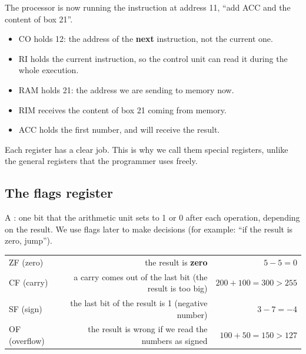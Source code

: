 \begin{mithal}
    The processor is now running the instruction at address 11, ``add ACC and the content of box 21''.
    \begin{itemize}
        \item CO holds 12: the address of the \textbf{next} instruction, not the current one.
        \item RI holds the current instruction, so the control unit can read it during the whole execution.
        \item RAM holds 21: the address we are sending to memory now.
        \item RIM receives the content of box 21 coming from memory.
        \item ACC holds the first number, and will receive the result.
    \end{itemize}
    Each register has a clear job. This is why we call them special registers, unlike the general registers
    that the programmer uses freely.
\end{mithal}

\subsection{The flags register}
\begin{tarif}
    A : one bit that the arithmetic unit sets to 1 or 0 after each
    operation, depending on the result. We use flags later to make decisions (for example: ``if the result is zero, jump'').
\end{tarif}

\begin{center}
\begin{tabularx}{\linewidth}{|>{\centering\arraybackslash}p{2.6cm}|R|R|}
    \hline
     &  &  \\ \hline
    ZF (zero) & the result is \textbf{zero} & $5 - 5 = 0$ \\ \hline
    CF (carry) & a carry comes out of the last bit (the result is too big) & $200 + 100 = 300 > 255$ \\ \hline
    SF (sign) & the last bit of the result is 1 (negative number) & $3 - 7 = -4$ \\ \hline
    OF (overflow) & the result is wrong if we read the numbers as signed & $100 + 50 = 150 > 127$ \\ \hline
\end{tabularx}
\end{center}

